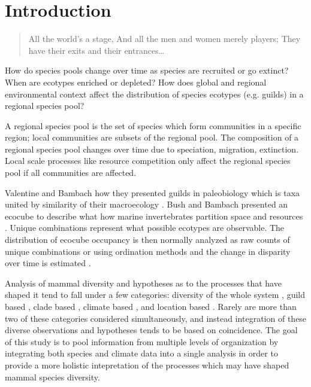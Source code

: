 \documentclass[12pt,letterpaper]{article}
\begin{document}
\section*{Introduction}

\begin{quotation}
  All the world's a stage, And all the men and women merely players; They have their exits and their entrances\dots
\end{quotation}

How do species pools change over time as species are recruited or go extinct? When are ecotypes enriched or depleted? How does global and regional environmental context affect the distribution of species ecotypes (e.g. guilds) in a regional species pool?

A regional species pool is the set of species which form communities in a specific region; local communities are subsets of the regional pool. The composition of a regional species pool changes over time due to speciation, migration, extinction. Local scale processes like resource competition only affect the regional species pool if all communities are affected.

Valentine and Bambach how they presented guilds in paleobiology which is taxa united by similarity of their macroecology \citep{Valentine1969,Bambach1977}. Bush and Bambach presented an ecocube to describe what how marine invertebrates partition space and resources \citep{Bush2007,Bambach2007,Bush2011}. Unique combinations represent what possible ecotypes are observable. The distribution of ecocube occupancy is then normally analyzed as raw counts of unique combinations or using ordination methods and the change in disparity over time is estimated \citep{Bush2007,Bambach2007,Bush2011}.


Analysis of mammal diversity and hypotheses as to the processes that have shaped it tend to fall under a few categories: diversity of the whole system \citep{Alroy2000g,Alroy1996a,Figueirido2012,Liow2008}, guild based \citep{Janis2004,Janis2000,Jernvall2004,Janis1993c,Pires2015a,Janis2008a}, clade based \citep{Quental2013,Slater2015c,Silvestro2015b}, climate based \citep{Blois2009,Janis1993c,Janis1993b}, and location based \citep{Eronen2015,Badgley2013}. Rarely are more than two of these categories considered simultaneously, and instead integration of these diverse observations and hypotheses tends to be based on coincidence. The goal of this study is to pool information from multiple levels of organization by integrating both species and climate data into a single analysis in order to provide a more holistic intepretation of the processes which may have shaped mammal species diversity.
\end{document}
